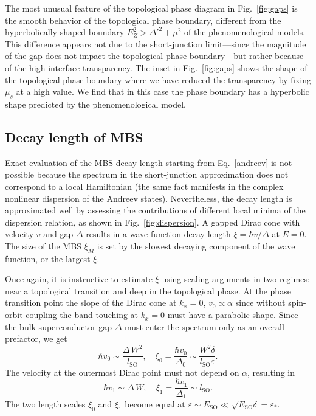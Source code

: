 \documentclass[twocolumn, notitlepage, 10pt, aps, floatfix, showpacs, prb, citeautoscript]{revtex4-1}
\newcommand{\comment}[1]{}
\begin{document}
\comment{But the phase boundary has no wiggles due to transparency.}
The most unusual feature of the topological phase diagram in Fig.~\ref{fig:gaps} is the smooth behavior of the topological phase boundary, different from the hyperbolically-shaped boundary $E_Z^2 > \Delta'^2 + \mu^2$ of the phenomenological models\cite{Lutchyn2010,Oreg2010,Lutchyn2011}.
This difference appears not due to the short-junction limit---since the magnitude of the gap does not impact the topological phase boundary---but rather because of the high interface transparency.
The inset in Fig.~\ref{fig:gaps} shows the shape of the topological phase boundary where we have reduced the transparency by fixing $\mu_s$ at a high value.
We find that in this case the phase boundary has a hyperbolic shape predicted by the phenomenological model.

\subsection{Decay length of MBS}

\comment{We calculate the decay length in the Dirac limit}
Exact evaluation of the MBS decay length starting from Eq.~\eqref{andreev} is not possible because the spectrum in the short-junction approximation does not correspond to a local Hamiltonian (the same fact manifests in the complex nonlinear dispersion of the Andreev states).
Nevertheless, the decay length is approximated well by assessing the contributions of different local minima of the dispersion relation, as shown in Fig.~\ref{fig:dispersion}.
A gapped Dirac cone with velocity $v$ and gap $\Delta$ results in a wave function decay length $\xi = \hbar v/\Delta$ at $E=0$.
The size of the MBS $\xi_M$ is set by the slowest decaying component of the wave function, or the largest $\xi$.

\comment{Using scaling arguments we find that the crossover between two regimes happens at $\sim E_{SO}$}
Once again, it is instructive to estimate $\xi$ using scaling arguments in two regimes: near a topological transition and deep in the topological phase.
At the phase transition point the slope of the Dirac cone at $k_x=0$, $v_0 \propto \alpha$ since without spin-orbit coupling the band touching at $k_x = 0$ must have a parabolic shape.
Since the bulk superconductor gap $\Delta$ must enter the spectrum only as an overall prefactor, we get
\begin{equation}\label{eq:v_k_0}
\hbar v_0 \sim \frac{\Delta\, W^2}{ l_\textrm{SO}},
\quad \xi_0 = \frac{\hbar v_0}{\Delta_0} \sim \frac{W^2 \delta}{l_\textrm{SO}\varepsilon}.
\end{equation}
The velocity at the outermost Dirac point must not depend on $\alpha$, resulting in
\begin{equation}\label{eq:v_k_f}
\hbar v_1 \sim \Delta\, W,
\quad \xi_1 = \frac{\hbar v_1}{\Delta_1} \sim l_\textrm{SO}.
\end{equation}
The two length scales $\xi_0$ and $\xi_1$ become equal at $\varepsilon \sim E_\textrm{SO} \ll \sqrt{E_\textrm{SO} \delta} = \varepsilon_*$.
\end{document}
